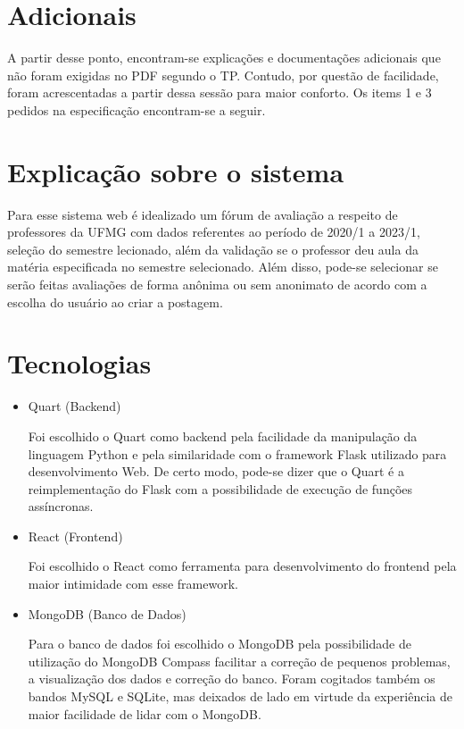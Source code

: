 \documentclass[12pt]{article}
\begin{document}
\section {Adicionais}
\par A partir desse ponto, encontram-se explicações e documentações adicionais que não foram exigidas no PDF segundo o TP. Contudo, por questão de facilidade, foram acrescentadas a partir dessa sessão para maior conforto. Os items 1 e 3 pedidos na especificação encontram-se a seguir.

\newpage

\section {Explicação sobre o sistema}
Para esse sistema web é idealizado um fórum de avaliação a respeito de professores da UFMG com dados referentes ao período de 2020/1 a 2023/1, seleção do semestre lecionado, além da validação se o professor deu aula da matéria especificada no semestre selecionado. Além disso, pode-se selecionar se serão feitas avaliações de forma anônima ou sem anonimato de acordo com a escolha do usuário ao criar a postagem.

\section {Tecnologias}
\begin {itemize}
\item Quart (Backend)
\par Foi escolhido o Quart como backend pela facilidade da manipulação da linguagem Python e pela similaridade com o framework Flask utilizado para desenvolvimento Web. De certo modo, pode-se dizer que o Quart é a reimplementação do Flask com a possibilidade de execução de funções assíncronas.
\item React (Frontend)
\par Foi escolhido o React como ferramenta para desenvolvimento do frontend pela maior intimidade com esse framework.
\item MongoDB (Banco de Dados)
\par Para o banco de dados foi escolhido o MongoDB pela possibilidade de utilização do MongoDB Compass facilitar a correção de pequenos problemas, a visualização dos dados e correção do banco. Foram cogitados também os bandos MySQL e SQLite, mas deixados de lado em virtude da experiência de maior facilidade de lidar com o MongoDB. 
\end {itemize}
\end{document}
